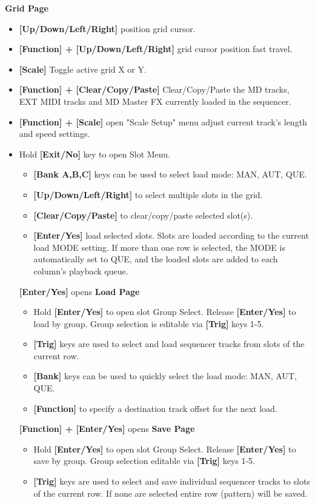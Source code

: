 \textbf{Grid Page}
    \begin{itemize}
      \item \textbf{[Up/Down/Left/Right]} position grid cursor. 
      \item \textbf{[Function] + [Up/Down/Left/Right]} grid cursor position fast travel.
      \item \textbf{[Scale]} Toggle active grid X or Y. 
      \item \textbf{[Function] + [Clear/Copy/Paste]} Clear/Copy/Paste  the MD tracks, EXT MIDI tracks and MD Master FX currently loaded in the sequencer.
      \item \textbf{[Function] + [Scale]} open "Scale Setup" menu adjust current track's length and speed settings.
      \item Hold \textbf{[Exit/No]} key to open Slot Menu.
      \begin{itemize}
                \item \textbf{[Bank A,B,C]} keys can be used to select load mode: MAN, AUT, QUE.
                \item \textbf{[Up/Down/Left/Right]} to select multiple slots in the grid.
                \item \textbf{[Clear/Copy/Paste]} to clear/copy/paste selected slot(s).
                \item \textbf{[Enter/Yes]} load selected slots. Slots are loaded according to the current load MODE setting. If more than one row is selected, the MODE is automatically set to QUE, and the loaded slots are added to each column's playback queue.                
      \end{itemize}

\textbf{[Enter/Yes]} opens \textbf{Load Page}
    \begin{itemize}
    \item Hold \textbf{[Enter/Yes]} to open slot Group Select. Release \textbf{[Enter/Yes]} to load by group. Group selection is editable via \textbf{[Trig]} keys 1-5.
    \item \textbf{[Trig]} keys are used to select and load sequencer tracks from slots of the current row.
    \item \textbf{[Bank]} keys can be used to quickly select the load mode: MAN, AUT, QUE.
    \item \textbf{[Function]} to specify a destination track offset for the next load.
    \end{itemize}
    
\textbf{[Function] + [Enter/Yes]} opens \textbf{Save Page}
    \begin{itemize}
    \item Hold \textbf{[Enter/Yes]} to open slot Group Select. Release \textbf{[Enter/Yes]} to save by group.  Group selection editable via \textbf{[Trig]} keys 1-5.
    \item \textbf{[Trig]} keys are used to select and save individual sequencer tracks to slots of the current row. If none are selected entire row (pattern) will be saved.
    \end{itemize}
\end{itemize}

